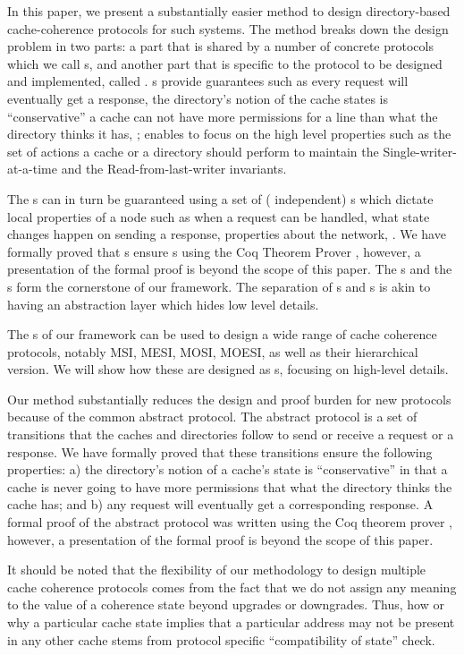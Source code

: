 In this paper, we present a substantially easier method to design
directory-based cache-coherence protocols for such systems. The method breaks
down the design problem in two parts: a part that is shared by a number of
concrete protocols which we call \glob{}s, and another part that is specific to
the protocol to be designed and implemented, called \policy{}. \glob{}s provide
guarantees such as every request will eventually get a response, the
directory's notion of the cache states is ``conservative'' \ie a cache can not
have more permissions for a line than what the directory thinks it has, \etc;
\glob{} enables \policy{} to focus on the high level properties such as the
set of actions a cache or a directory should perform to maintain the
Single-writer-at-a-time and the Read-from-last-writer invariants.

The \glob{}s can in turn be guaranteed using a set of (\policy{} independent)
\local{}s which dictate local properties of a node such as when a request can be
handled, what state changes happen on sending a response, properties about the network,
\etc. We have formally proved that \local{}s ensure \glob{}s using the
Coq Theorem Prover \cite{}, however, a presentation of the formal proof is
beyond the scope of this paper. The \glob{}s and the \local{}s form the
cornerstone of our framework. The separation of \glob{}s and \local{}s is akin
to having an abstraction layer which hides low level details.

The \glob{}s of our framework can be used to design a wide range of cache
coherence protocols, notably MSI, MESI, MOSI, MOESI, as well as their
hierarchical version. We will show how these are designed as \policy{}s,
focusing on high-level details.

Our method substantially reduces the design and proof burden for new protocols
because of the common abstract protocol. The abstract protocol is a set of
transitions that the caches and directories follow to send or receive a request
or a response. We have formally proved that these transitions ensure the
following properties: a) the directory's notion of a cache's state is
``conservative'' in that a cache is never going to have more permissions that
what the directory thinks the cache has; and b) any request will eventually get
a corresponding response. A formal proof of the abstract protocol was written
using the Coq theorem prover \cite{}, however, a presentation of the formal
proof is beyond the scope of this paper.

It should be noted that the flexibility of our methodology to design multiple
cache coherence protocols comes from the fact that we do not assign any meaning
to the value of a coherence state beyond upgrades or downgrades. Thus, how or
why a particular cache state implies that a particular address may not be
present in any other cache stems from protocol specific ``compatibility of
state'' check. 

